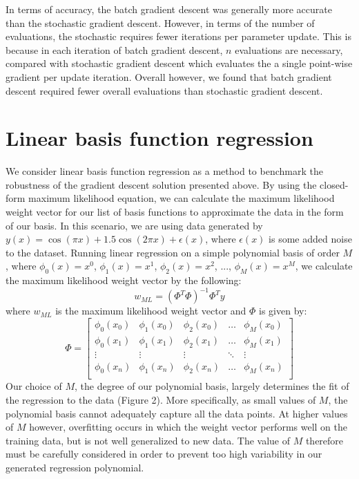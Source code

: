 \documentclass{article}
\begin{document}
In terms of accuracy, the batch gradient descent was generally more accurate than the stochastic gradient descent. However, in terms of the number of evaluations, the stochastic requires fewer iterations per parameter update. This is because in each iteration of batch gradient descent, $n$ evaluations are necessary, compared with stochastic gradient descent which evaluates the a single point-wise gradient per update iteration. Overall however, we found that batch gradient descent required fewer overall evaluations than stochastic gradient descent.

\section{Linear basis function regression}

We consider linear basis function regression as a method to benchmark the robustness of the gradient descent solution presented above. By using the closed-form maximum likelihood equation, we can calculate the maximum likelihood weight vector for our list of basis functions to approximate the data in the form of our basis. In this scenario, we are using data generated by $y(x) = \cos(\pi x) + 1.5 \cos(2 \pi x) + \epsilon(x)$, where $\epsilon(x)$ is some added noise to the dataset. Running linear regression on a simple polynomial basis of order $M$, where $\phi_0(x) = x^0$, $\phi_1(x) = x^1$, $\phi_2(x) = x^2$, ..., $\phi_M(x) = x^M$, we calculate the maximum likelihood weight vector by the following:
$$w_{ML} = (\Phi^T \Phi)^{-1} \Phi^T y$$
where $w_{ML}$ is the maximum likelihood weight vector and $\Phi$ is given by:
$$\Phi =
\begin{bmatrix}
  \phi_0(x_0)   & \phi_1(x_0)   & \phi_2(x_0)   & \dots   & \phi_M(x_0) \\
  \phi_0(x_1)   & \phi_1(x_1)   & \phi_2(x_1)   & \dots   & \phi_M(x_1) \\
  \vdots        & \vdots        & \vdots        & \ddots  & \vdots \\
  \phi_0(x_n)   & \phi_1(x_n)   & \phi_2(x_n)   & \dots   & \phi_M(x_n) \\
\end{bmatrix}
$$
Our choice of $M$, the degree of our polynomial basis, largely determines the fit of the regression to the data (Figure 2). More specifically, as small values of $M$, the polynomial basis cannot adequately capture all the data points. At higher values of $M$ however, overfitting occurs in which the weight vector performs well on the training data, but is not well generalized to new data. The value of $M$ therefore must be carefully considered in order to prevent too high variability in our generated regression polynomial. \\
\end{document}
